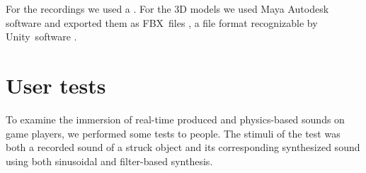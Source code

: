 For the recordings we used a . For the 3D models we used Maya Autodesk software \cite{bib:maya} and exported them as FBX\textregistered\ files \cite{bib:fbx}, a file format recognizable by Unity\textregistered\ software \cite{bib:unity}.

\section{User tests}

To examine the immersion of real-time produced and physics-based sounds on game players, we performed some tests to people. The stimuli of the test was both a recorded sound of a struck object and its corresponding synthesized sound using both sinusoidal and filter-based synthesis.